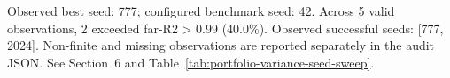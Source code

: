 Observed best seed: 777; configured benchmark seed: 42.
Across 5 valid observations, 2 exceeded far-R2 > 0.99 (40.0\%).
Observed successful seeds: [777, 2024].
Non-finite and missing observations are reported separately in the audit JSON.
See Section~6 and Table~\ref{tab:portfolio-variance-seed-sweep}.
